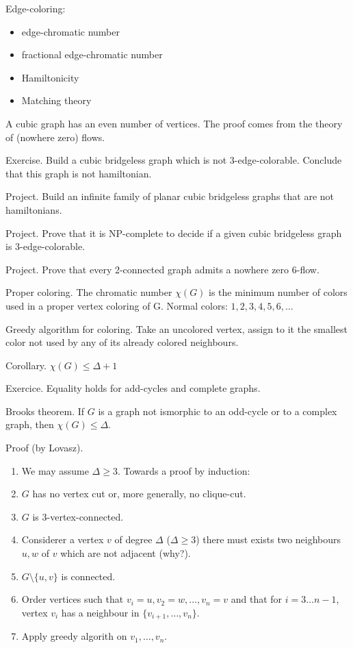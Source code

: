\documentclass[12pt,a4paper]{article}
\begin{document}
Edge-coloring:
\begin{itemize}
\item edge-chromatic number
\item fractional edge-chromatic number
\item Hamiltonicity
\item Matching theory
\end{itemize}

A cubic graph has an even number of vertices. The proof comes from the theory of
(nowhere zero) flows.

Exercise. Build a cubic bridgeless graph which is not 3-edge-colorable. Conclude
that this graph is not hamiltonian.

Project. Build an infinite family of planar cubic bridgeless graphs that are not
hamiltonians.

Project. Prove that it is NP-complete to decide if a given cubic bridgeless
graph is 3-edge-colorable.

Project. Prove that every 2-connected graph admits a nowhere zero 6-flow.

Proper coloring.  The chromatic number \(\chi(G)\) is the minimum number of
colors used in a proper vertex coloring of G. Normal colors: \(1, 2, 3, 4, 5, 6,
\dots\)

Greedy algorithm for coloring.  Take an uncolored vertex, assign to it the
smallest color not used by any of its already colored neighbours.

Corollary. \(\chi(G) \leq \Delta + 1\)

Exercice. Equality holds for add-cycles and complete graphs.

Brooks theorem. If \(G\) is a graph not ismorphic to an odd-cycle or to a
complex graph, then \(\chi(G) \leq \Delta\).

Proof (by Lovasz).

\begin{enumerate}
\item We may assume \(\Delta \geq 3\). Towards a proof by induction:
\item \(G\) has no vertex cut or, more generally, no clique-cut.
\item \(G\) is 3-vertex-connected.
\item Considerer a vertex \(v\) of degree \(\Delta\) (\(\Delta \geq 3\)) there
must exists two neighbours \(u, w\) of \(v\) which are not adjacent (why?).
\item \(G \setminus \{u, v\}\) is connected.
\item Order vertices such that \(v_i=u, v_2=w, \dots, v_n=v\) and that for \(i=3
\dots n-1\), vertex \(v_i\) has a neighbour in \(\{v_{i+1}, \dots, v_n\}\).
\item Apply greedy algorith on \(v_1, \dots, v_n\).
\end{enumerate}
\end{document}
